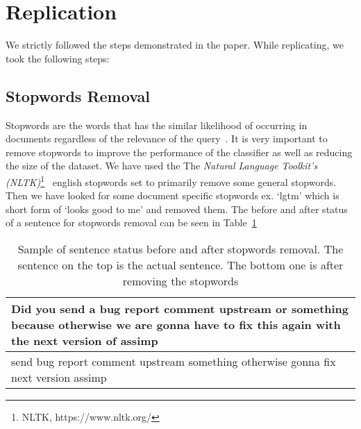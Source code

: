 \section{Replication}
\label{sect:replication}
We strictly followed the steps demonstrated in the paper. While replicating, we took the following steps:

\subsection{Stopwords Removal}
Stopwords are the words that has the similar likelihood of occurring in documents regardless of the relevance of the query~\cite{Wilbur1992}. It is very important to remove stopwords to improve the performance of the classifier as well as reducing the size of the dataset. We have used the The \emph{Natural Language Toolkit's (NLTK)}\footnote{NLTK, https://www.nltk.org/}~\cite{Loper2002} english stopwords set to primarily remove some general stopwords. Then we have looked for some document specific stopwords ex. `lgtm' which is short form of `looks good to me' and removed them. The before and after status of a sentence for stopwords removal can be seen in Table~\ref{tbl:stopwords_removal}
  \begin{table}
  	\caption{Sample of sentence status before and after stopwords removal. The sentence on the top is the actual sentence. The bottom one is after removing the stopwords  }
  	\begin{tabular}{ p{3.25in}}
	 	\toprule
	  		Did you send a bug report comment upstream or something because otherwise we are gonna have to fix this again with the next version of assimp \\
  		\midrule
	  		send bug report comment upstream something otherwise gonna fix next version assimp \\
  		\bottomrule

  	\end{tabular}
  	\label{tbl:stopwords_removal}
  \end{table}   

